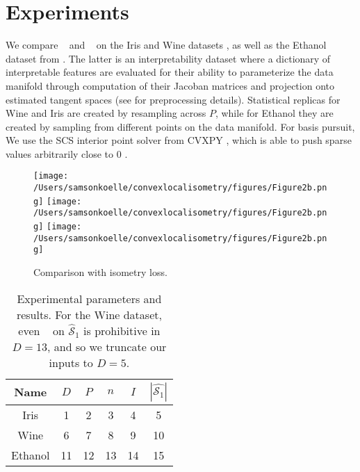 \section{Experiments}
\label{sec:experiments}

We compare \tsip~ and \greedy~ on the Iris and Wine datasets \citep{misc_iris_53, misc_wine_109, scikit-learn}, as well as the Ethanol dataset from \citet{Chmiela2018-at, Koelle2022-ju}.
The latter is an interpretability dataset where a dictionary of interpretable features are evaluated for their ability to parameterize the data manifold through computation of their Jacoban matrices and projection onto estimated tangent spaces (see \citet{Koelle2022-ju} for preprocessing details).
Statistical replicas for Wine and Iris are created by resampling across $P$, while for Ethanol they are created by sampling from different points on the data manifold.
For basis pursuit, We use the SCS interior point solver \citep{ocpb:16} from CVXPY \citep{diamond2016cvxpy, agrawal2018rewriting}, which is able to push sparse values arbitrarily close to 0 \citep{cvxpy_sparse_solution}.

\begin{figure}[h]
\centering
{}
{\texttt{[image: /Users/samsonkoelle/convexlocalisometry/figures/Figure2b.png]}}
{\texttt{[image: /Users/samsonkoelle/convexlocalisometry/figures/Figure2b.png]}}
{\texttt{[image: /Users/samsonkoelle/convexlocalisometry/figures/Figure2b.png]}}
\caption{Comparison with isometry loss.}
\label{fig:boxplots}
\end{figure}

\begin{table}[h!]
\centering
\begin{tabular}{c|c|c|c|c|c|}
\hline
Name & $D$ & $P$ & $n$ & $I$ & $|\widehat{\mathcal{S}_1}|$ \\ \hline
Iris & 1 & 2 & 3 & 4 & 5 \\ \hline
Wine & 6 & 7 & 8 & 9 & 10 \\ \hline
Ethanol & 11 & 12 & 13 & 14 & 15 \\ \hline
\end{tabular}
\caption{Experimental parameters and results.
For the Wine dataset, even \brute~ on $\widehat {\mathcal S}_1$ is prohibitive in $D=13$, and so we truncate our inputs to $D=5$.}
\label{tab:sample}
\end{table}